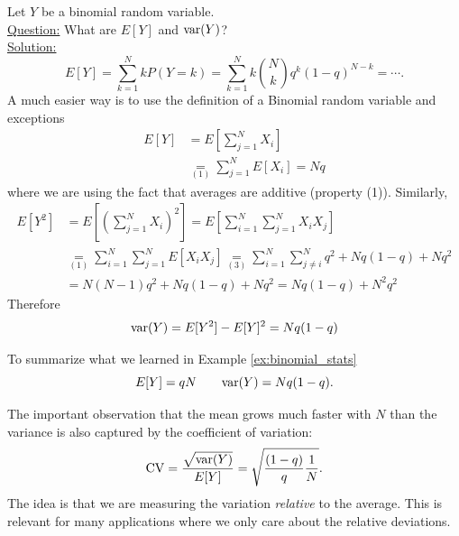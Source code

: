 \begin{example}\label{ex:binomial_stats}
Let $Y$ be a binomial random variable. \\
 
 \noindent
\underline{Question:} What are $E[Y]$ and ${\rm var}(Y)$?\\
 
 
  \noindent
\underline{Solution:} 
\begin{equation*}
E[Y] = \sum_{k=1}^N k P(Y=k) =\sum_{k=1}^N k  {N \choose k}q^{k}(1-q)^{N-k} = \cdots. 
\end{equation*}
A much easier way is to use the definition of a Binomial random variable and exceptions 
\begin{align*}
E[Y] &= E\left[\sum_{j=1}^NX_i\right]\\
& \underset{(1)}{=}  \sum_{j=1}^NE\left[X_i\right]  =Nq
\end{align*}
where we are using the fact that averages are additive (property (1)). Similarly, 
\begin{align*}
E[Y^2] &= E\left[\left(\sum_{j=1}^NX_i\right)^2\right] = E\left[\sum_{i=1}^N\sum_{j=1}^NX_iX_j\right] \\
&\underset{(1)}{=}  \sum_{i=1}^N\sum_{j=1}^NE[X_iX_j]\underset{(3)}{=} \sum_{i=1}^N\sum_{j \ne i}^Nq^2 +  Nq(1-q) + Nq^2\\
&= N(N-1)q^2 + Nq(1-q)  +  Nq^2 = Nq(1-q)  + N^2q^2
\end{align*}
Therefore 
\begin{equation*}
{\rm var}(Y) =E[Y^2]-E[Y]^2 =  Nq(1-q)
\end{equation*}
\end{example}
 
To summarize what we learned in Example \ref{ex:binomial_stats}
\begin{equation}\label{eq:binomial_meanvar}
E[Y] = qN \quad\quad{\rm var}(Y) = Nq(1-q). 
\end{equation}


 
 The important observation that the mean grows much faster with $N$ than the variance is also captured by the coefficient of variation: 
\begin{equation*}
{\rm CV} = \frac{\sqrt{{\rm var}(Y)}}{E[Y]} = \sqrt{\frac{(1-q)}{q} \frac{1}{N}}. 
\end{equation*}
The idea is that we are measuring the variation \emph{relative} to the average. This is relevant for many applications where we only care about the relative deviations. 

